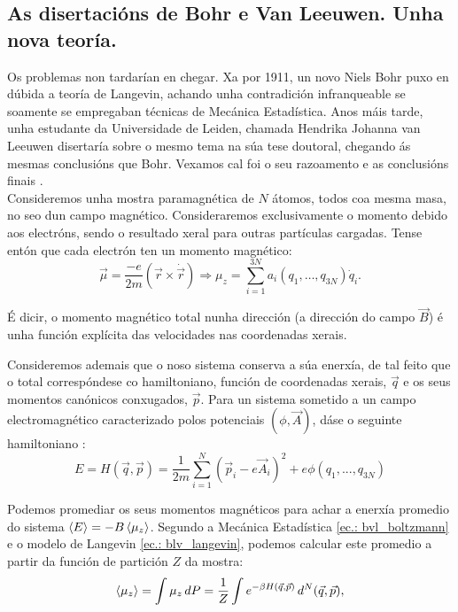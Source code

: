 \begin{refsection}
\begin{multicols}{2}
\subsection*{As disertacións de Bohr e Van Leeuwen. Unha nova teoría.}

Os problemas non tardarían en chegar. Xa por 1911, un novo Niels Bohr puxo en
dúbida a teoría de Langevin, achando unha contradición infranqueable se
soamente se empregaban técnicas de Mecánica Estadística. Anos máis tarde, unha
estudante da Universidade de Leiden, chamada Hendrika Johanna van Leeuwen
disertaría sobre o mesmo tema na súa tese doutoral, chegando ás mesmas
conclusións que Bohr. Vexamos cal foi o seu razoamento e as conclusións finais
\cite[Sec. 1.2.2.]{blundell.s_2001}.\\

Consideremos unha mostra paramagnética de $N$ átomos, todos coa mesma masa, no
seo dun campo magnético. Consideraremos exclusivamente o momento debido aos
electróns, sendo o resultado xeral para outras partículas cargadas. Tense entón
que cada electrón ten un momento magnético:
$$\vec \mu = \frac{-e}{2m} ({\vec r}\times \dot {\vec r}) \Rightarrow
\mu_z=\sum_{i=1}^{3N}a_i(q_1,\dots,q_{3N})\dot q_i.$$

É dicir, o momento magnético total nunha dirección (a dirección do campo $\vec
B$) é unha función explícita das velocidades nas coordenadas xerais.

Consideremos ademais que o noso sistema conserva a súa enerxía, de tal feito
que o total correspóndese co hamiltoniano, función de coordenadas xerais, $\vec
q$ e os seus momentos canónicos conxugados, $\vec p$. Para un sistema sometido
a un campo electromagnético caracterizado polos potenciais $(\phi,\vec A)$,
dáse o seguinte hamiltoniano :
\begin{equation}\label{ec.: bvl_hamiltoniano}
    E=H(\vec q,\vec p) = \frac{1}{2m}\sum_{i=1}^N (\vec p_i - e\vec
    A_i)^2 + e\phi(q_1,...,q_{3N})
\end{equation}

Podemos promediar os seus momentos magnéticos para achar a enerxía promedio do
sistema $\braket{E} = -B\braket{\mu_z}$. Segundo a Mecánica Estadística
\eqref{ec.: bvl_boltzmann} e o modelo de Langevin \eqref{ec.: blv_langevin},
podemos calcular este promedio a partir da función de partición $Z$ da mostra:
\begin{equation}\label{ec.: bvl-mec_est}
    \braket{\mu_z} = \int \mu_z\, dP = \frac{1}{Z}\int e^{-\beta
    H(\vec q,\vec p)} \, d^N(\vec q, \vec p),
\end{equation}


\end{multicols}
\end{refsection}
